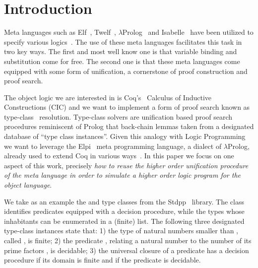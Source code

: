 \documentclass[sigconf,natbib=false,review]{acmart}
\begin{document}

\maketitle

\section{Introduction}
\label{sec:intro}

Meta languages such as Elf~\cite{elf}, Twelf~\cite{twelf},
$\lambda$Prolog~\cite{miller_nadathur_2012} and
Isabelle~\cite{10.1007/978-3-540-71067-7_7}
have been utilized to specify various
logics~\cite{felty88cade,books/sp/NipkowPW02,10.1007/BF00881873,felty93lics}.
The use of these meta languages facilitates this task in two
key ways. The first and most well know one is that variable binding and
substitution come for free. %
The second one is that these meta languages come equipped with some form
of unification, a cornerstone of proof construction and proof search.

The object logic we are interested in is Coq's~\cite{Coq-refman}
Calculus of Inductive Constructions (CIC) and we want to implement a
form of proof search known as type-class~\cite{wadler89,sozeau08} resolution.
Type-class solvers are unification based proof search procedures
reminiscent of Prolog that back-chain lemmas taken
from a designated database of ``type class instances''. Given this
analogy with Logic Programming we want to leverage the
Elpi~\cite{tassi:hal-01637063} meta programming language,
a dialect of $\lambda$Prolog, already used to extend
Coq in various ways~\cite{tassi:hal-01637063,tassi:hal-01897468,gregoire:hal-03800154,newtc}.
In this paper we focus on one aspect of
this work, precisely \emph{how to reuse the higher order unification procedure
of the meta language in order to simulate a higher order logic program
for the object language}.

We take as an example the  and  type classes
from the Stdpp~\cite{JUNG_KREBBERS_JOURDAN_BIZJAK_BIRKEDAL_DREYER_2018}
library. The class  
identifies predicates equipped with a decision procedure, while
 the types whose inhabitants can be enumerated in a (finite) list.
The following three designated type-class instances state that:
1) the type of natural numbers smaller than , called ,
is finite;
2) the predicate , relating a natural number
 to the number of its prime factors , is decidable;
3) the universal closure of a predicate has a decision procedure if
its domain is finite and if the predicate is decidable.
\end{document}
